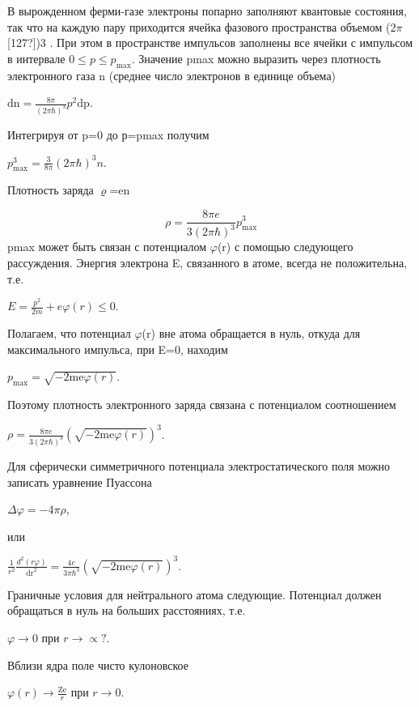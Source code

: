 \documentclass[a4paper,14pt, openany, twoside, draft]{extbook} %
\begin{document}
В вырожденном ферми-газе электроны попарно заполняют квантовые состояния, так что на каждую пару приходится ячейка фазового пространства объемом (2${\pi}$\textlatin{[127?]})3 . При этом в пространстве импульсов заполнены все ячейки с импульсом в интервале  $0\le p\le p_{\text{max}}$. Значение pmax можно выразить через плотность электронного газа n (среднее число электронов в единице объема)

 ${\text{dn}}=\frac{8\pi }{(2\pi \hbar )^3}p^2{\text{dp}}$.

Интегрируя от p=0 до р=pmax получим

 $p_{\text{max}}^3=\frac 3{8\pi }(2\pi \hbar )^3n$.

Плотность заряда ${\varrho}$=en

\begin{equation*}
\rho =\frac{8\mathit{\pi e}}{3(2\pi \hbar )^3}p_{\text{max}}^3
\end{equation*}
pmax может быть связан с потенциалом ${\varphi}$(r) с помощью следующего рассуждения. Энергия электрона E, связанного в атоме, всегда не положительна, т.е.

 $E=\frac{p^2}{2m}+\mathit{e\varphi }(r)\le 0$.

Полагаем, что потенциал ${\varphi}$(r) вне атома обращается в нуль, откуда для максимального импульса, при E=0, находим

 $p_{\text{max}}=\sqrt{-2{\text{me}}\varphi (r)}$.

Поэтому плотность электронного заряда связана с потенциалом соотношением

 $\rho =\frac{8\mathit{\pi e}}{3(2\pi \hbar )^3}\left(\sqrt{-2{\text{me}}\varphi (r)}\right)^3$.

Для сферически симметричного потенциала электростатического поля можно записать уравнение Пуассона

 $\Delta \varphi =-4\pi\rho$,

или

 $\frac 1{r^2}\frac{d^2(\mathit{r\varphi })}{{\text{dr}}^2}=\frac{4e}{3\pi \hbar ^3}\left(\sqrt{-2{\text{me}}\varphi (r)}\right)^3$.

Граничные условия для нейтрального атома следующие. Потенциал должен обращаться в нуль на больших расстояниях, т.е.

 $\varphi \rightarrow 0$ при  $r\rightarrow \propto ?$.

Вблизи ядра поле чисто кулоновское

 $\varphi (r)\rightarrow \frac{{\text{Ze}}} r$ при  $r\rightarrow 0$.
\end{document}
